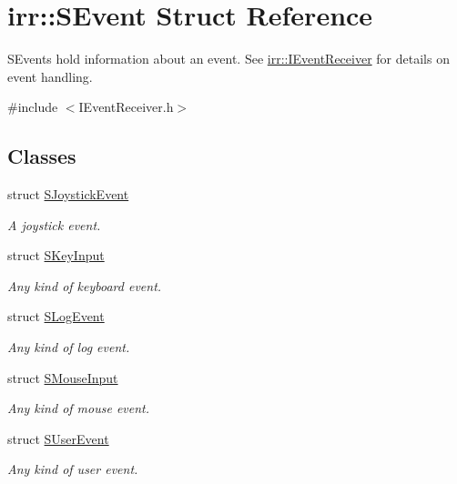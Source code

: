 \hypertarget{structirr_1_1SEvent}{}\section{irr\+:\+:S\+Event Struct Reference}
\label{structirr_1_1SEvent}


S\+Events hold information about an event. See \hyperlink{classirr_1_1IEventReceiver}{irr\+::\+I\+Event\+Receiver} for details on event handling.  




{\ttfamily \#include $<$I\+Event\+Receiver.\+h$>$}

\subsection*{Classes}
\begin{DoxyCompactItemize}
\item 
struct \hyperlink{structirr_1_1SEvent_1_1SJoystickEvent}{S\+Joystick\+Event}
\begin{DoxyCompactList}\small\item\em A joystick event. \end{DoxyCompactList}\item 
struct \hyperlink{structirr_1_1SEvent_1_1SKeyInput}{S\+Key\+Input}
\begin{DoxyCompactList}\small\item\em Any kind of keyboard event. \end{DoxyCompactList}\item 
struct \hyperlink{structirr_1_1SEvent_1_1SLogEvent}{S\+Log\+Event}
\begin{DoxyCompactList}\small\item\em Any kind of log event. \end{DoxyCompactList}\item 
struct \hyperlink{structirr_1_1SEvent_1_1SMouseInput}{S\+Mouse\+Input}
\begin{DoxyCompactList}\small\item\em Any kind of mouse event. \end{DoxyCompactList}\item 
struct \hyperlink{structirr_1_1SEvent_1_1SUserEvent}{S\+User\+Event}
\begin{DoxyCompactList}\small\item\em Any kind of user event. \end{DoxyCompactList}\end{DoxyCompactItemize}
